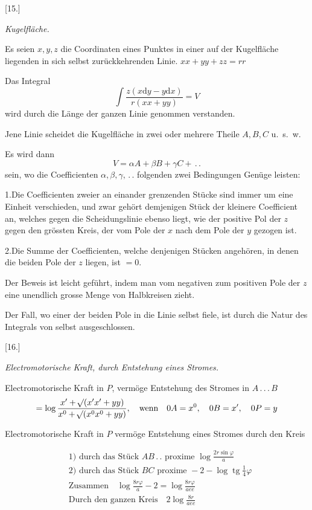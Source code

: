 \begin{center}[15.]\par\medskip\textit{Kugelfläche.}\end{center}
Es seien $x,y,z$ die Coordinaten eines Punktes in einer auf der Kugelfläche liegenden in sich selbst zurückkehrenden Linie. $xx+yy+zz=rr$

Das Integral
\[
\int\frac{z(x\mathrm dy-y\mathrm dx)}{r(xx+yy)}=V
\]
wird durch die Länge der ganzen Linie genommen verstanden.

Jene Linie scheidet die Kugelfläche in zwei oder mehrere Theile $A,B,C$ u.\ s.\ w.

Es wird dann
\[
V=\alpha A+\beta B+\gamma C+\,.\,.
\]
sein, wo die Coefficienten $\alpha,\beta,\gamma,\,.\,.$ folgenden zwei Bedingungen Genüge leisten:

1.\quad Die Coefficienten zweier an einander grenzenden Stücke sind immer um eine Einheit verschieden, und zwar gehört demjenigen Stück der kleinere Coefficient an, welches gegen die Scheidungslinie ebenso liegt, wie der positive Pol der $z$ gegen den grössten Kreis, der vom Pole der $x$ nach dem Pole der $y$ gezogen ist.

2.\quad Die Summe der Coefficienten, welche denjenigen Stücken angehören, in denen die beiden Pole der $z$ liegen, ist $=0$.

Der Beweis ist leicht geführt, indem man vom negativen zum positiven Pole der $z$ eine unendlich grosse Menge von Halbkreisen zieht.

Der Fall, wo einer der beiden Pole in die Linie selbst fiele, ist durch die Natur des Integrals von selbst ausgeschlossen.

\begin{center}[16.]\par\medskip\textit{Electromotorische Kraft, durch Entstehung eines Stromes.}\end{center}
\begin{center}\resizebox{.76\textwidth}{!}{}\end{center}
Electromotorische Kraft in $P$, vermöge Entstehung des Stromes in $A\, .\, .\, .\, B$
\[
=\log\frac{x'+\mathord{{}^{}\!\surd}(x'x'+yy)}{x^0+\mathord{{}^{}\!\surd}(x^0x^0+yy)},\quad\text{wenn}\quad0A=x^0,\quad0B=x',\quad0P=y
\]

Electromotorische Kraft in $P$ vermöge Entstehung eines Stromes durch den Kreis
\begin{center}\resizebox{.36\textwidth}{!}{}\end{center}
\[
\begin{aligned}
&\text{1) durch das Stück }AB\,.\,.\text{ proxime }\log\frac{2r\sin\varphi}{a}\\
&\text{2) durch das Stück }BC\text{ proxime }-2-\log\operatorname{tg}\tfrac14\varphi\\
&\text{Zusammen}\quad\log\frac{8r\varphi}{a}-2=\log\frac{8r\varphi}{aee}\\
&\text{Durch den ganzen Kreis}\quad2\log\frac{8r}{aee}
\end{aligned}
\]

